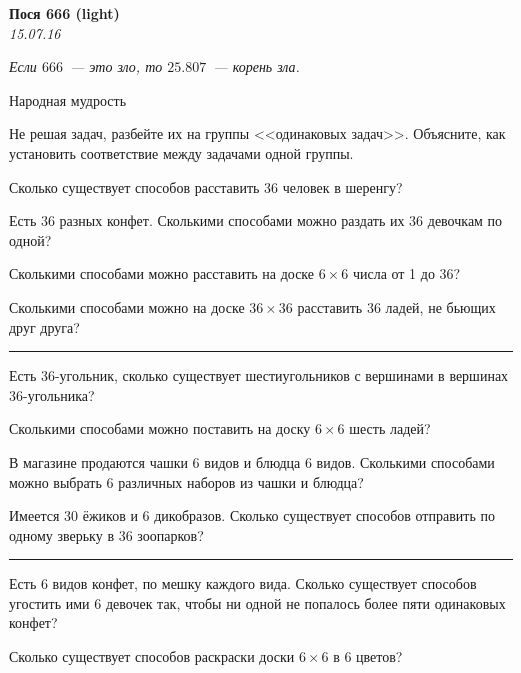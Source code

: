 \begin{center}
\textbf{\Large Пося 666 (light)}\\
\textit{15.07.16}
\end{center}

\epigraph{\it Если $666$~--- это зло, то $25.807$~--- корень зла.}{Народная мудрость}

Не решая задач, разбейте их на группы <<одинаковых задач>>. Объясните, как установить соответствие между задачами одной группы.

\begin{problems}
\item Сколько существует способов расставить 36 человек в шеренгу? %

\item Есть 36 разных конфет. Сколькими способами можно раздать их 36 девочкам по одной? %

\item Сколькими способами можно расставить на доске $6\times6$ числа от 1 до 36? %

\item Сколькими способами можно на доске $36\times36$  расставить 36 ладей, не бьющих друг друга? %

\strut\hrule

\item Есть 36-угольник, сколько существует шестиугольников с вершинами в вершинах 36-угольника? %

\item Сколькими способами можно поставить на доску $6\times6$ шесть ладей? %

\item В магазине продаются чашки 6 видов и блюдца 6 видов. Сколькими способами можно выбрать 6 различных наборов из чашки и блюдца? %

\item Имеется 30 ёжиков и 6 дикобразов. Сколько существует способов отправить по одному зверьку в 36 зоопарков? %

\strut\hrule

\item Есть 6 видов конфет, по мешку каждого вида. Сколько существует способов угостить ими 6 девочек так, чтобы ни одной не попалось более пяти одинаковых конфет? %

\item Сколько существует способов раскраски доски $6\times6$ в 6 цветов? %


\end{problems}
